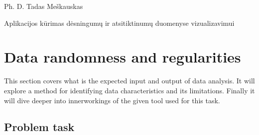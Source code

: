 \documentclass[a4paper,12pt,fleqn]{article}
\begin{document}
{}{}{}{}%
{Ph. D. Tadas Meškauskas}

\tableofcontents



\bothabstracts{}%
{Aplikacijos kūrimas dėsningumų ir atsitiktinumų duomenyse vizualizavimui} %
{}%




\newpage


\section{Data randomness and regularities}
This section covers what is the expected input and output of data analysis. 
It will explore a method for identifying data characteristics and its limitations.
Finally it will dive deeper into innerworkings of the given tool used for this task.


\subsection{Problem task}
 


\end{document}
